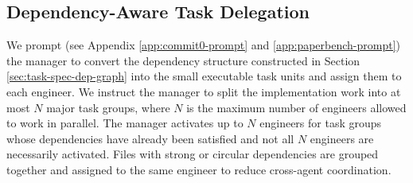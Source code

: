 


\subsection{Dependency-Aware Task Delegation}
\label{sec:dep-awa-delegation}


We prompt (see Appendix \ref{app:commit0-prompt} and \ref{app:paperbench-prompt}) the manager to convert the dependency structure constructed in Section \ref{sec:task-spec-dep-graph} into the small executable task units and assign them to each engineer. We instruct the manager to split the implementation work into at most $N$ major task groups, where $N$ is the maximum number of engineers allowed to work in parallel. The manager activates up to $N$ engineers for task groups whose dependencies have already been satisfied and not all $N$ engineers are necessarily activated. Files with strong or circular dependencies are grouped together and assigned to the same engineer to reduce cross-agent coordination. 


